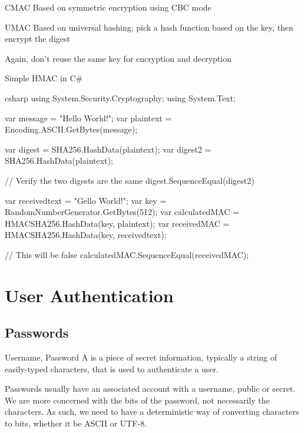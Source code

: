\documentclass[12pt]{report}
\begin{document}
\begin{dfnbox}{CMAC}{}
    Based on symmetric encryption using CBC mode
\end{dfnbox}


\begin{dfnbox}{UMAC}{}
    Based on universal hashing; pick a hash function based on the key, then encrypt the digest
\end{dfnbox}

Again, don't reuse the same key for encryption and decryption

\begin{codebox}{Simple HMAC in C\#}{}{}
    \begin{amzcode}{csharp}
using System.Security.Cryptography;
using System.Text;

var message = "Hello World!";
var plaintext = Encoding.ASCII.GetBytes(message);

var digest = SHA256.HashData(plaintext);
var digest2 = SHA256.HashData(plaintext);

// Verify the two digests are the same
digest.SequenceEqual(digest2)

var receivedtext = "Gello World!";
var key = RandomNumberGenerator.GetBytes(512);
var calculatedMAC = HMACSHA256.HashData(key, plaintext);
var receivedMAC = HMACSHA256.HashData(key, receivedtext);

// This will be false
calculatedMAC.SequenceEqual(receivedMAC);
    \end{amzcode}
\end{codebox}

\chapter{User Authentication}

\section{Passwords}

\begin{dfnbox}{Username, Password}{}
    A  is a piece of secret information, typically a string of easily-typed characters, that is used to authenticate a user.
\end{dfnbox}


Passwords usually have an associated account with a username, public or secret. We are more concerned with the bits of the password, not necessarily the characters. As such, we need to have a deterministic way of converting characters to bits, whether it be ASCII or UTF-8.
\end{document}
